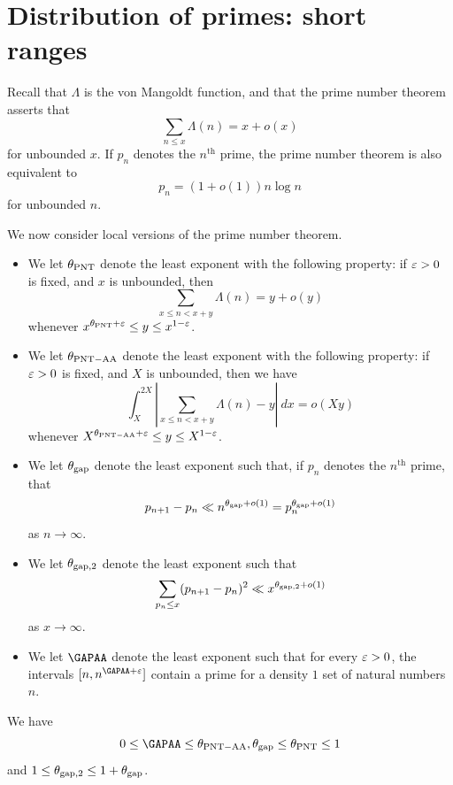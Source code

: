 \chapter{Distribution of primes: short ranges}\label{primes-sec}

Recall that $\Lambda$ is the von Mangoldt function, and that the prime number theorem asserts that
$$ \sum_{n \leq x} \Lambda(n) = x + o(x)$$
for unbounded $x$.  If $p_n$ denotes the $n^{\mathrm{th}}$ prime, the prime number theorem is also equivalent to
$$ p_n = (1+o(1)) n \log n$$
for unbounded $n$.

We now consider local versions of the prime number theorem.

\begin{definition}\label{pnt-ap}
    \begin{itemize}
        \item[(i)] We let $\theta_{\mathrm{PNT}}$ denote the least exponent with the following property: if $\varepsilon > 0$ is fixed, and $x$ is unbounded, then
        $$ \sum_{x \leq n < x+y} \Lambda(n) = y + o(y)$$
        whenever $x^{\theta_{\mathrm{PNT}} + \varepsilon} \leq y \leq x^{1-\varepsilon}$.
        \item[(ii)] We let $\theta_{\mathrm{PNT-AA}}$ denote the least exponent with the following property: if $\varepsilon > 0$ is fixed, and $X$ is unbounded, then we have
        $$ \int_X^{2X} |\sum_{x \leq n < x+y} \Lambda(n)-y|\ dx = o(Xy)$$
        whenever $X^{\theta_{\mathrm{PNT-AA}} + \varepsilon} \leq y \leq X^{1-\varepsilon}$.
        \item[(iii)] We let $\theta_{\mathrm{gap}}$ denote the least exponent such that, if $p_n$ denotes the $n^{\mathrm{th}}$ prime, that
        $$ p_{n+1} - p_n \ll n^{\theta_{\mathrm{gap}}+o(1)} = p_n^{\theta_{\mathrm{gap}}+o(1)}$$
        as $n \to \infty$.
        \item[(iv)] We let $\theta_{\mathrm{gap},2}$ denote the least exponent such that
        $$ \sum_{p_n \leq x} (p_{n+1}-p_n)^2 \ll x^{\theta_{\mathrm{gap},2}+o(1)}$$
        as $x \to \infty$.
        \item[(v)] We let $\GAPAA$ denote the least exponent such that for every $\varepsilon>0$, the intervals $[n, n^{\GAPAA+\eps}]$ contain a prime for a density $1$ set of natural numbers $n$.
    \end{itemize}
\end{definition}

\begin{lemma}\label{pnt-triv}
    We have
    $$ 0 \leq \GAPAA \leq \PNTAA, \GAPMAX \leq \PNTALL \leq 1$$
    and $1 \leq \theta_{\mathrm{gap},2} \leq 1+\theta_{\mathrm{gap}}$.
\end{lemma}

